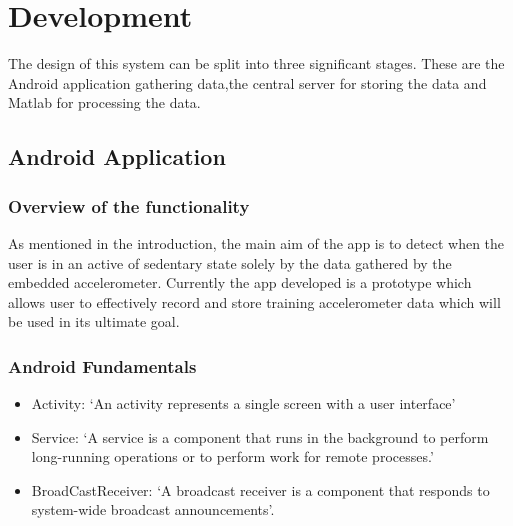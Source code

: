 \chapter{Development} %
\label{cha:chapter_development}

The design of this system can be split into three significant stages. These are the Android application gathering data,the central server for storing the data and Matlab for processing the data. 

\section{Android Application} %
\label{sec:section_app}

\subsection{Overview of the functionality} %
\label{sub:subsection_appoverview}
As mentioned in the introduction, the main aim of the app is to detect when the user is in an active of sedentary state solely by the data gathered by the embedded accelerometer. Currently the app developed is a prototype which allows user to effectively record and store training accelerometer data which will be used in its ultimate goal.

\subsection{Android Fundamentals} %
\label{sub:android_fundamentals}
\begin{itemize}
  \item Activity: `An activity represents a single screen with a user interface'
  \item Service: `A service is a component that runs in the background to perform long-running operations or to perform work for remote processes.'
  \item BroadCastReceiver: `A broadcast receiver is a component that responds to system-wide broadcast announcements'.
\end{itemize}

